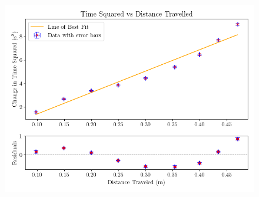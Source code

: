 \documentclass[12pt]{article}
\begin{document}
	
\begin{figure}[H] \begin{center} \includegraphics[width=\textwidth]{.figure-1.png} \end{center} \caption{}\label{visina8} \end{figure}
\medskip
\end{document}
